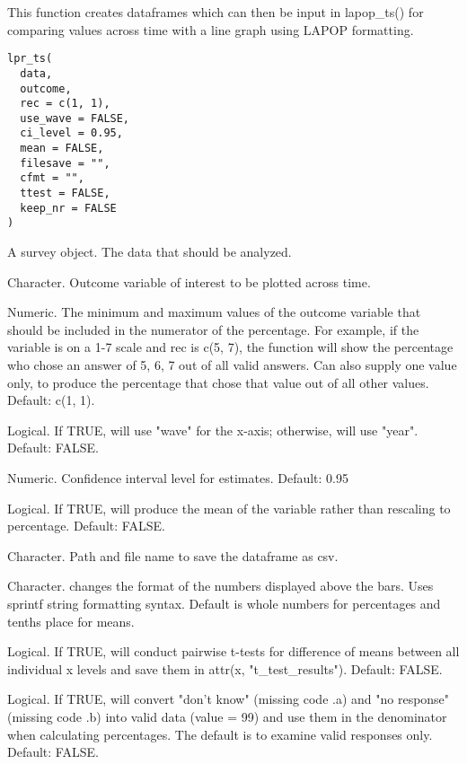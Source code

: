 \documentclass[a4paper]{book}
\begin{document}
%
\begin{Description}
This function creates dataframes which can then be input in lapop\_ts() for
comparing values across time with a line graph using LAPOP formatting.
\end{Description}
%
\begin{Usage}
\begin{verbatim}
lpr_ts(
  data,
  outcome,
  rec = c(1, 1),
  use_wave = FALSE,
  ci_level = 0.95,
  mean = FALSE,
  filesave = "",
  cfmt = "",
  ttest = FALSE,
  keep_nr = FALSE
)
\end{verbatim}
\end{Usage}
%
\begin{Arguments}
\begin{ldescription}
\item[\code{data}] A survey object.  The data that should be analyzed.

\item[\code{outcome}] Character.  Outcome variable of interest to be plotted
across time.

\item[\code{rec}] Numeric. The minimum and maximum values of the outcome variable that
should be included in the numerator of the percentage.  For example, if the variable
is on a 1-7 scale and rec is c(5, 7), the function will show the percentage who chose
an answer of 5, 6, 7 out of all valid answers.  Can also supply one value only,
to produce the percentage that chose that value out of all other values.
Default: c(1, 1).

\item[\code{use\_wave}] Logical.  If TRUE, will use "wave" for the x-axis; otherwise,
will use "year".  Default: FALSE.

\item[\code{ci\_level}] Numeric. Confidence interval level for estimates.  Default: 0.95

\item[\code{mean}] Logical.  If TRUE, will produce the mean of the variable rather than
rescaling to percentage.  Default: FALSE.

\item[\code{filesave}] Character.  Path and file name to save the dataframe as csv.

\item[\code{cfmt}] Character. changes the format of the numbers displayed above the bars.
Uses sprintf string formatting syntax. Default is whole numbers for percentages
and tenths place for means.

\item[\code{ttest}] Logical.  If TRUE, will conduct pairwise t-tests for difference
of means between all individual x levels and save them in attr(x,
"t\_test\_results"). Default: FALSE.

\item[\code{keep\_nr}] Logical.  If TRUE, will convert "don't know" (missing code .a)
and "no response" (missing code .b) into valid data (value = 99) and use them
in the denominator when calculating percentages.  The default is to examine
valid responses only.  Default: FALSE.
\end{ldescription}
\end{Arguments}
\end{document}
